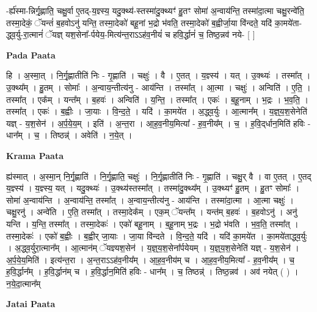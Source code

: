\documentclass[17pt]{extarticle}
\begin{document}
-र्ह्य॑स्मा-न्निर्गृ॒ह्णाति॒ चक्षु॒र्वा ए॒तद्-य॒ज्ञ्स्य॒ यदु॒क्थ्य॑-स्तस्मा॑दु॒क्थ्यꣳ॑ हु॒तꣳ सोमा॑ अ॒न्वाय॑न्ति॒ तस्मा॑दा॒त्मा चक्षु॒रन्वे॑ति॒ तस्मा॒देकं॒ ॅयन्तं॑ ब॒हवोऽनु॑ यन्ति॒ तस्मा॒देको॑ बहू॒नां भ॒द्रो भ॑वति॒ तस्मा॒देको॑ ब॒ह्वीर्जा॒या वि॑न्दते॒ यदि॑ का॒मये॑ता-द्ध्व॒र्यु-रा॒त्मानं॑ ॅयज्ञ् यश॒सेना᳚-र्पयेय॒-मित्य॑न्त॒राऽऽह॑व॒नीयं॑ च हवि॒र्द्धानं॑ च॒ तिष्ठ॒न्नव॑ नये- [  ] \newline

\textbf{Pada Paata} \newline

हि । अ॒स्मा॒त् । नि॒र्गृ॒ह्णातीति॑ निः - गृ॒ह्णाति॑ । चक्षुः॑ । वै । ए॒तत् । य॒ज्ञ्स्य॑ । यत् । उ॒क्थ्यः॑ । तस्मा᳚त् । उ॒क्थ्य᳚म् । हु॒तम् । सोमाः᳚ । अ॒न्वाय॒न्तीत्य॑नु - आय॑न्ति । तस्मा᳚त् । आ॒त्मा । चक्षुः॑ । अन्विति॑ । ए॒ति॒ । तस्मा᳚त् । एक᳚म् । यन्त᳚म् । ब॒हवः॑ । अन्विति॑ । य॒न्ति॒ । तस्मा᳚त् । एकः॑ । ब॒हू॒नाम् । भ॒द्रः । भ॒व॒ति॒ । तस्मा᳚त् । एकः॑ । ब॒ह्वीः । जा॒याः । वि॒न्द॒ते॒ । यदि॑ । का॒मये॑त । अ॒द्ध्व॒र्युः । आ॒त्मान᳚म् । य॒ज्ञ्॒य॒श॒सेनेति॑ यज्ञ् - य॒श॒सेन॑ । अ॒र्प॒ये॒य॒म् । इति॑ । अ॒न्त॒रा । आ॒ह॒व॒नीय॒मित्या᳚ - ह॒व॒नीय᳚म् । च॒ । ह॒वि॒द्‌र्धान॒मिति॑ हविः - धान᳚म् । च॒ । तिष्ठन्न्॑ । अवेति॑ । न॒ये॒त् ।  \newline


\textbf{Krama Paata} \newline

ह्य॑स्मात् । अ॒स्मा॒न् नि॒र्गृ॒ह्णाति॑ । नि॒र्गृ॒ह्णाति॒ चक्षुः॑ । नि॒र्गृ॒ह्णातीति॑ निः - गृ॒ह्णाति॑ । चक्षु॒र् वै । वा ए॒तत् । ए॒तद् य॒ज्ञ्स्य॑ । य॒ज्ञ्स्य॒ यत् । यदु॒क्थ्यः॑ । उ॒क्थ्य॑स्तस्मा᳚त् । तस्मा॑दु॒क्थ्य᳚म् । उ॒क्थ्यꣳ॑ हु॒तम् । हु॒तꣳ सोमाः᳚ । सोमा॑ अ॒न्वाय॑न्ति । अ॒न्वाय॑न्ति॒ तस्मा᳚त् । अ॒न्वाय॒न्तीत्य॑नु - आय॑न्ति । तस्मा॑दा॒त्मा । आ॒त्मा चक्षुः॑ । चक्षु॒रनु॑ । अन्वे॑ति । ए॒ति॒ तस्मा᳚त् । तस्मा॒देक᳚म् । एक॒म् ॅयन्त᳚म् । यन्त॑म् ब॒हवः॑ । ब॒हवोऽनु॑ । अनु॑ यन्ति । य॒न्ति॒ तस्मा᳚त् । तस्मा॒देकः॑ । एको॑ बहू॒नाम् । ब॒हू॒नाम् भ॒द्रः । भ॒द्रो भ॑वति । भ॒व॒ति॒ तस्मा᳚त् । तस्मा॒देकः॑ । एको॑ ब॒ह्वीः । ब॒ह्वीर् जा॒याः । जा॒या वि॑न्दते । वि॒न्द॒ते॒ यदि॑ । यदि॑ का॒मये॑त । का॒मये॑ताद्ध्व॒र्युः । अ॒द्ध्व॒र्युरा॒त्मान᳚म् । आ॒त्मान॑म् ॅयज्ञ्यश॒सेन॑ । य॒ज्ञ्॒य॒श॒सेना᳚र्पयेयम् । य॒ज्ञ्॒य॒श॒सेनेति॑ यज्ञ् - य॒श॒सेन॑ । अ॒र्प॒ये॒य॒मिति॑ । इत्य॑न्त॒रा । अ॒न्त॒राऽऽह॑व॒नीय᳚म् । आ॒ह॒व॒नीय॑म् च । आ॒ह॒व॒नीय॒मित्या᳚ - ह॒व॒नीय᳚म् । च॒ ह॒वि॒र्द्धान᳚म् । ह॒वि॒र्द्धान॑म् च । ह॒वि॒र्द्धान॒मिति॑ हविः - धान᳚म् । च॒ तिष्ठन्न्॑ । तिष्ठ॒न्नव॑ । अव॑ नयेत् ( ) । न॒ये॒दा॒त्मान᳚म् \newline

\textbf{Jatai Paata} \newline
\end{document}
